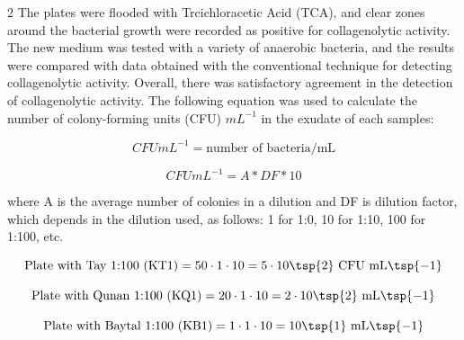 \begin{multicols}{2}
The plates were flooded with Trcichloracetic Acid (TCA), and clear zones
around the bacterial growth were recorded as positive for collagenolytic
activity. The new medium was tested with a variety of anaerobic
bacteria, and the results were compared with data obtained with the
conventional technique for detecting collagenolytic activity. Overall,
there was satisfactory agreement in the detection of collagenolytic
activity. The following equation was used to calculate the number of
colony-forming units (CFU) \({mL}^{- 1}\) in the exudate of each
samples:

\begin{equation}
CFU mL^{-1} = \text{number of bacteria/mL}
\end{equation}

\begin{equation}
CFU mL^{-1} = A*DF*10
\end{equation}

where A is the average number of colonies in a dilution and DF is
dilution factor, which depends in the dilution used, as follows: 1 for
1:0, 10 for 1:10, 100 for 1:100, etc.
\end{multicols}

\[\text{Plate with Tay 1:100 (KT1)} = 50 \cdot 1 \cdot 10 = 5 \cdot 10\tsp{2}\ \text{CFU mL}\tsp{-1} \]

\[\text{Plate with Qunan 1:100 (KQ1)} = 20 \cdot 1 \cdot 10 = 2 \cdot 10\tsp{2}\ \text{mL}\tsp{-1} \]

\[\text{Plate with Baytal 1:100 (KB1)} = 1 \cdot 1 \cdot 10 = 10\tsp{1}\ \text{mL}\tsp{-1} \]

